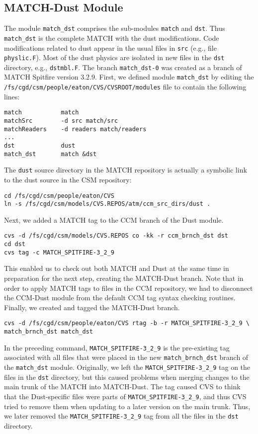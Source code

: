 \documentclass[12pt,twoside]{article}
\begin{document}
\subsection{MATCH-Dust Module}\label{sxn:cvs_match_dst}
The module \verb'match_dst' comprises the sub-modules \verb'match' and
\verb'dst'. 
Thus \verb'match_dst' is the complete MATCH with the dust modifications. 
Code modifications related to dust appear in the usual files in
\verb'src' (e.g., file \verb'physlic.F'). 
Most of the dust physics are isolated in new files in the \verb'dst'
directory, e.g., \verb'dstmbl.F'.
The branch \verb'match_dst-0' was created as a branch of MATCH
Spitfire version 3.2.9.
First, we defined module \verb'match_dst' by editing the
\verb'/fs/cgd/csm/people/eaton/CVS/CVSROOT/modules' file to contain
the following lines: 
\begin{verbatim}
match           match
matchSrc        -d src match/src
matchReaders    -d readers match/readers
...
dst             dust
match_dst       match &dst
\end{verbatim}
The \verb'dust' source directory in the MATCH repository is actually a
symbolic link to the dust source in the CSM repository: 
\begin{verbatim}
cd /fs/cgd/csm/people/eaton/CVS
ln -s /fs/cgd/csm/models/CVS.REPOS/atm/ccm_src_dirs/dust .
\end{verbatim}
Next, we added a MATCH tag to the CCM branch of the Dust module.
\begin{verbatim}
cvs -d /fs/cgd/csm/models/CVS.REPOS co -kk -r ccm_brnch_dst dst
cd dst
cvs tag -c MATCH_SPITFIRE-3_2_9
\end{verbatim}
This enabled us to check out both MATCH and Dust at the same time in
preparation for the next step, creating the MATCH-Dust branch.
Note that in order to apply MATCH tags to files in the CCM repository,
we had to disconnect the CCM-Dust module from the default CCM tag
syntax checking routines.
Finally, we created and tagged the MATCH-Dust branch.
\begin{verbatim}
cvs -d /fs/cgd/csm/people/eaton/CVS rtag -b -r MATCH_SPITFIRE-3_2_9 \
match_brnch_dst match_dst
\end{verbatim}
In the preceding command, \verb'MATCH_SPITFIRE-3_2_9' is the
pre-existing tag associated with all files that were placed in the 
new \verb'match_brnch_dst' branch of the \verb'match_dst' module.
Originally, we left the \verb'MATCH_SPITFIRE-3_2_9' tag on the files
in the \verb'dst' directory, but this caused problems when merging
changes to the main trunk of the MATCH into MATCH-Dust.
The tag caused CVS to think that the Dust-specific files were parts of
\verb'MATCH_SPITFIRE-3_2_9', and thus CVS tried to remove them when
updating to a later version on the main trunk.
Thus, we later removed the \verb'MATCH_SPITFIRE-3_2_9' tag from all
the files in the \verb'dst' directory.
\end{document}
